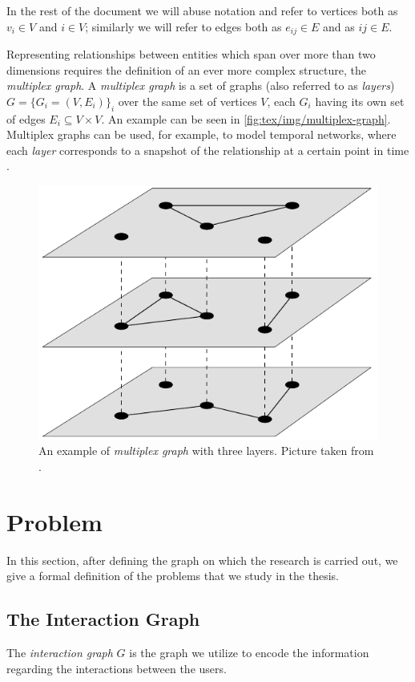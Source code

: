 \bigskip

In the rest of the document we will abuse notation and refer to vertices both
as $v_{i} \in V $ and $i \in V$; similarly we will refer to edges both as
$e_{ij} \in E $ and as $ij \in E$.

\bigskip

Representing relationships between entities which span over more than two
dimensions requires the definition of an ever more complex structure, the
\emph{multiplex graph}. A \emph{multiplex graph} is a set of graphs (also
referred to as \emph{layers}) $G = \{ G_i = (V, E_i)\} _i$ over the same set of
vertices $V$, each $G_i$ having its own set of edges $E_i \subseteq V \times V
$. An
example can be seen in \autoref{fig:tex/img/multiplex-graph}. Multiplex graphs
can be used, for example, to model temporal networks, where
each \emph{layer} corresponds to a snapshot of the relationship at a certain
point in time \cite{Newman2018}.

\begin{figure}
	\centering
	\includegraphics[width=0.4\linewidth]{tex/img/multiplex-graph.png}
	\caption[An example of multiplex graph]{An example of \emph{multiplex
			graph} with three layers. Picture taken from
		\cite{Newman2018}.}%
	\label{fig:tex/img/multiplex-graph}
\end{figure}

\section{Problem}
\label{sec:problem}

In this section, after defining the graph on which the research is
carried out, we give a formal definition of the problems that we
study in the thesis.

\subsection{The Interaction Graph}
\label{sub:interaction-graph}

The \emph{interaction graph} $G$ is the graph we utilize to encode the
information regarding the interactions between the users.

